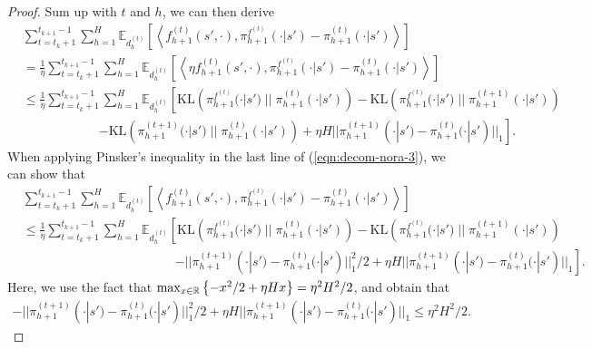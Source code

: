 \begin{proof}
Sum up with $t$ and $h$, we can then derive
\begin{align}\label{eqn:decom-nora-3}
    &\sum_{t=t_k+1}^{t_{k+1}-1} \sum_{h=1}^H \mathbb{E}_{d_h^{(t)}}\left[\left\langle f_{h+1}^{(t)}(s', \cdot), \pi_{h+1}^{f^{(t)}}(\cdot | s') - \pi_{h+1}^{(t)}(\cdot | s')\right\rangle \right]\nonumber\\
    &= \frac{1}{\eta} \sum_{t=t_k+1}^{t_{k+1}-1} \sum_{h=1}^H \mathbb{E}_{d_h^{(t)}}\left[ \left\langle \eta f_{h+1}^{(t)}(s', \cdot), \pi_{h+1}^{f^{(t)}}(\cdot | s') - \pi_{h+1}^{(t)}(\cdot | s')\right\rangle\right] \nonumber\\
    &\leq \frac{1}{\eta} \sum_{t=t_k+1}^{t_{k+1}-1} \sum_{h=1}^H \mathbb{E}_{d_h^{(t)}}\left[\text{KL}\left(\pi_{h+1}^{f^{(t)}}(\cdot | s')\; || \;\pi_{h+1}^{(t)}(\cdot | s')\right) - \text{KL}\left(\pi_{h+1}^{f^{(t)}}(\cdot | s')\; || \;\pi_{h+1}^{(t+1)}(\cdot | s')\right) \right.\nonumber\\
    &\qquad\qquad\qquad \left.- \text{KL}\left(\pi_{h+1}^{(t+1)}(\cdot | s')\; || \;\pi_{h+1}^{(t)}(\cdot | s')\right) + \eta H ||\pi_{h+1}^{(t+1)}(\cdot | s') - \pi_{h+1}^{(t)}(\cdot | s')||_1\right].
\end{align}
When applying Pinsker's inequality in the last line of (\ref{eqn:decom-nora-3}), we can show that
\begin{align}\label{eqn:decom-nora-4}
    &\sum_{t=t_k+1}^{t_{k+1}-1} \sum_{h=1}^H \mathbb{E}_{d_h^{(t)}}\left[\left\langle f_{h+1}^{(t)}(s', \cdot), \pi_{h+1}^{f^{(t)}}(\cdot | s') - \pi_{h+1}^{(t)}(\cdot | s')\right\rangle \right] \nonumber\\
    &\leq \frac{1}{\eta} \sum_{t=t_k+1}^{t_{k+1}-1} \sum_{h=1}^H \mathbb{E}_{d_h^{(t)}}\left[ \text{KL}\left(\pi_{h+1}^{f^{(t)}}(\cdot | s')\; || \;\pi_{h+1}^{(t)}(\cdot | s')\right) - \text{KL}\left(\pi_{h+1}^{f^{(t)}}(\cdot | s')\; || \;\pi_{h+1}^{(t+1)}(\cdot | s')\right) \right. \nonumber\\
    &\qquad\qquad\qquad\qquad\qquad\qquad  \left. - ||\pi_{h+1}^{(t+1)}(\cdot | s') - \pi_{h+1}^{(t)}(\cdot | s')||_1^2/2 + \eta H ||\pi_{h+1}^{(t+1)}(\cdot | s') - \pi_{h+1}^{(t)}(\cdot | s')||_1 \right].
\end{align}
Here, we use the fact that $\max_{x\in {\mathbb{R}}}\left\{-x^2/2 + \eta H x\right\} = \eta^2H^2/2$, and obtain that 
\begin{align*}
    - ||\pi_{h+1}^{(t+1)}(\cdot | s') - \pi_{h+1}^{(t)}(\cdot | s')||_1^2/2 + \eta H ||\pi_{h+1}^{(t+1)}(\cdot | s') - \pi_{h+1}^{(t)}(\cdot | s')||_1\leq\eta^2H^2/2.
\end{align*}


\end{proof}
